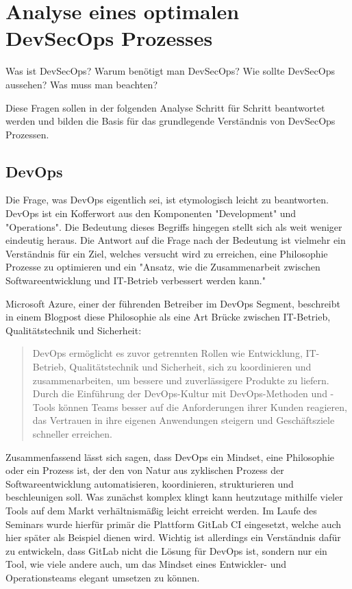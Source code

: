 \section{Analyse eines optimalen DevSecOps Prozesses}\label{sec:analysisDevSecOps}
Was ist DevSecOps?
Warum benötigt man DevSecOps?
Wie sollte DevSecOps aussehen?
Was muss man beachten?

Diese Fragen sollen in der folgenden Analyse Schritt für Schritt beantwortet werden und bilden die Basis für das grundlegende Verständnis von DevSecOps Prozessen.

\subsection{DevOps}
Die Frage, was DevOps eigentlich sei, ist etymologisch leicht zu beantworten.
DevOps ist ein Kofferwort aus den Komponenten "Development" und "Operations".
Die Bedeutung dieses Begriffs hingegen stellt sich als weit weniger eindeutig heraus.
Die Antwort auf die Frage nach der Bedeutung ist vielmehr ein Verständnis für ein Ziel, welches versucht wird zu erreichen, eine Philosophie Prozesse zu optimieren und ein "Ansatz, wie die Zusammenarbeit zwischen Softwareentwicklung und IT-Betrieb verbessert werden kann."\cite{DevOps2021}

Microsoft Azure, einer der führenden Betreiber im DevOps Segment, beschreibt in einem Blogpost diese Philosophie als eine Art Brücke zwischen IT-Betrieb, Qualitätstechnik und Sicherheit\cite{WasIstDevOps}:
\begin{quote}
    DevOps ermöglicht es zuvor getrennten Rollen wie Entwicklung, IT-Betrieb, Qualitätstechnik und Sicherheit, sich zu koordinieren und zusammenarbeiten, um bessere und zuverlässigere Produkte zu liefern.
    Durch die Einführung der DevOps-Kultur mit DevOps-Methoden und -Tools können Teams besser auf die Anforderungen ihrer Kunden reagieren, das Vertrauen in ihre eigenen Anwendungen steigern und Geschäftsziele schneller erreichen.
\end{quote}

Zusammenfassend lässt sich sagen, dass DevOps ein Mindset, eine Philosophie oder ein Prozess ist, der den von Natur aus zyklischen Prozess der Softwareentwicklung automatisieren, koordinieren, strukturieren und beschleunigen soll.
Was zunächst komplex klingt kann heutzutage mithilfe vieler Tools auf dem Markt verhältnismäßig leicht erreicht werden.
Im Laufe des Seminars wurde hierfür primär die Plattform GitLab CI eingesetzt, welche auch hier später als Beispiel dienen wird.
Wichtig ist allerdings ein Verständnis dafür zu entwickeln, dass GitLab nicht die Lösung für DevOps ist, sondern nur ein Tool, wie viele andere auch, um das Mindset eines Entwickler- und Operationsteams elegant umsetzen zu können.

